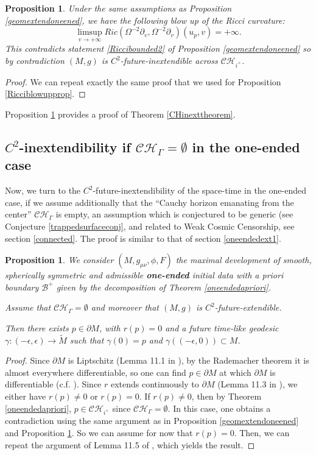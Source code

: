 \documentclass[10pt,a4paper]{article}
\theoremstyle{plain}
\newtheorem{prop}[thm]{Proposition}
\theoremstyle{remark}
\theoremstyle{definition}
\theoremstyle{plain}
\theoremstyle{remark}
\theoremstyle{definition}
\newcommand{\CH}{\mathcal{CH}_{i^+}}
\numberwithin{equation}{section}
\begin{document}
\begin{prop} \label{inextproponeended} Under the same assumptions as Proposition \ref{geomextendoneened}, we have the following blow up of the Ricci curvature: $$ \limsup_{v \rightarrow +\infty} Ric(\Omega^{-2} \partial_v, \Omega^{-2} \partial_v)(u_p,v)=+\infty.$$
	This contradicts statement \ref{Riccibounded2} of Proposition \ref{geomextendoneened} so by contradiction $(M,g)$ is $C^2$-future-inextendible across $\CH$.
\end{prop}
\begin{proof} We can repeat exactly the same proof that we used for Proposition \eqref{Ricciblowupprop}.
\end{proof} 

Proposition \ref{inextproponeended} provides a proof of Theorem \ref{CHinexttheorem}.
\subsection{$C^2$-inextendibility if $\mathcal{CH}_{\Gamma}=\emptyset$ in the one-ended case}
Now, we turn to the $C^2$-future-inextendibility of the space-time in the one-ended case, if we assume additionally that the ``Cauchy horizon emanating from the center'' $\mathcal{CH}_{\Gamma}$ is empty, an assumption which is conjectured to be generic (see Conjecture \ref{trappedsurfaceconj}, and related to Weak Cosmic Censorship, see section \ref{connected}. The proof is similar to that of section \ref{oneendedext1}.

\begin{prop} \label{oneendedCHgammaprop}
	We consider $(M,g_{\mu \nu}, \phi,F)$ the maximal development of smooth, spherically symmetric and admissible \textbf{one-ended} initial data with a priori boundary $\mathcal{B^+}$ given by the decomposition of Theorem \ref{oneendedapriori}.
	
	Assume that $\mathcal{CH}_{\Gamma}=\emptyset$ and moreover that $(M,g)$ is $C^2$-future-extendible.
	
	Then there exists $p \in \partial M$, with $r(p)=0$ and a future time-like geodesic $\gamma:(-\epsilon,\epsilon) \rightarrow \tilde{M}$ such that $\gamma(0)=p$ and $\gamma((-\epsilon,0)) \subset M$.
\end{prop}
\begin{proof}
	Since $\partial M$ is Liptschitz (Lemma 11.1 in \cite{JonathanStab}), by the Rademacher theorem it is almost everywhere differentiable, so one can find $p \in \partial M$ at which $\partial M$ is differentiable (c.f. \cite{JonathanStab}). Since $r$ extends continuously to $\partial M$ (Lemma 11.3 in \cite{JonathanStab}), we either have $r(p) \neq 0$ or $r(p)=0$. If $r(p) \neq 0$, then by Theorem \ref{oneendedapriori}, $p \in \CH$ since $\mathcal{CH}_{\Gamma}=\emptyset$. In this case, one obtains a contradiction using the same argument as in Proposition \ref{geomextendoneened} and Proposition \ref{inextproponeended}. So we can assume for now that $r(p)=0$. Then, we can repeat the argument of Lemma 11.5 of \cite{JonathanStab}, which yields the result.
\end{proof}
\end{document}
